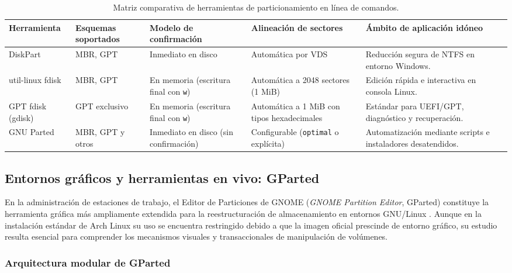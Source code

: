 \documentclass[12pt]{article}
\begin{document}
\begin{table}[H]
\centering
\small
\caption{Matriz comparativa de herramientas de particionamiento en línea de comandos.}
\label{tab:comparativaHerramientasParticionado}
\begin{tabularx}{\textwidth}{@{} l >{\raggedright\arraybackslash}p{2.6cm} >{\raggedright\arraybackslash}p{3.2cm} >{\raggedright\arraybackslash}p{2.8cm} X @{}}
\toprule
\textbf{Herramienta} & \textbf{Esquemas soportados} & \textbf{Modelo de confirmación} & \textbf{Alineación de sectores} & \textbf{Ámbito de aplicación idóneo} \\
\midrule
DiskPart & MBR, GPT & Inmediato en disco & Automática por VDS & Reducción segura de NTFS en entorno Windows. \\
util-linux fdisk & MBR, GPT & En memoria (escritura final con \texttt{w}) & Automática a 2048 sectores (1 MiB) & Edición rápida e interactiva en consola Linux. \\
GPT fdisk (gdisk) & GPT exclusivo & En memoria (escritura final con \texttt{w}) & Automática a 1 MiB con tipos hexadecimales & Estándar para UEFI/GPT, diagnóstico y recuperación. \\
GNU Parted & MBR, GPT y otros & Inmediato en disco (sin confirmación) & Configurable (\texttt{optimal} o explícita) & Automatización mediante scripts e instaladores desatendidos. \\
\bottomrule
\end{tabularx}
\end{table}

\subsection{Entornos gráficos y herramientas en vivo: GParted}
\label{sec:entornosGraficosGparted}

En la administración de estaciones de trabajo, el Editor de Particiones de GNOME (\textit{GNOME Partition Editor}, GParted) constituye la herramienta gráfica más ampliamente extendida para la reestructuración de almacenamiento en entornos GNU/Linux \parencite{gparted2024manual}. Aunque en la instalación estándar de Arch Linux su uso se encuentra restringido debido a que la imagen oficial prescinde de entorno gráfico, su estudio resulta esencial para comprender los mecanismos visuales y transaccionales de manipulación de volúmenes.

\subsubsection{Arquitectura modular de GParted}
\end{document}
